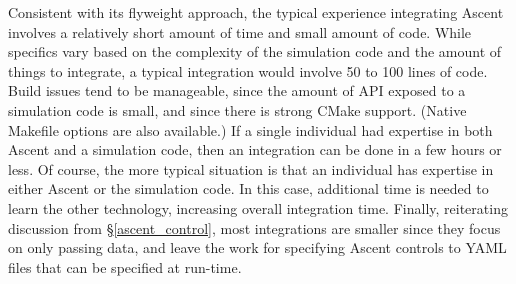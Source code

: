 Consistent with its flyweight approach, the typical experience integrating Ascent involves a
relatively short amount of time and small amount of code.
%
While specifics vary based on the complexity of the simulation code and the
amount of things to integrate, a typical integration would involve
50 to 100 lines of code.
%
Build issues tend to be manageable, since the amount of API exposed to a simulation code
is small, and since there is strong CMake support.  
%
(Native Makefile options are also available.)
%
If a single individual had expertise in both Ascent and a simulation code, then
an integration can be done in a few hours or less.
%
Of course, the more typical situation is that an individual has expertise in either
Ascent or the simulation code. 
%
In this case, additional time is needed to learn the other technology,
increasing overall integration time.
%
Finally, reiterating discussion from \S\ref{ascent_control}, most integrations
are smaller since they focus on only passing data, and leave the work for specifying
Ascent controls to YAML files that can be specified at run-time.



